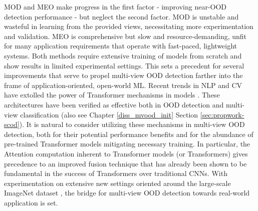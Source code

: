 MOD and MEO make progress in the first factor - improving near-OOD detection performance - but neglect the second factor. MOD is unstable and wasteful in learning from the provided views, necessitating more experimentation and validation. MEO is comprehensive but slow and resource-demanding, unfit for many application requirements that operate with fast-paced, lightweight systems. Both methods require extensive training of models from scratch and show results in limited experimental settings.
This sets a precedent for several improvements that serve to propel multi-view OOD detection farther into the frame of application-oriented, open-world ML. Recent trends in NLP and CV have extolled the power of Transformer mechanisms in models \cite{dosovitskiy2020image,achiam2023gpt,wang2024mutualformer}. These architectures have been verified as effective both in OOD detection and multi-view classification \cite{sun2022out,fort2021exploring,zhao2023cddfuse} (also see Chapter \ref{diss_mvood_init} Section \ref{sec:propwork-scod}). It is natural to consider utilizing these mechanisms in multi-view OOD detection, both for their potential performance benefits and for the abundance of pre-trained Transformer models mitigating necessary training. In particular, the Attention computation inherent to Transformer models (or Transformers) gives precedence to an improved fusion technique that has already been shown to be fundamental in the success of Transformers over traditional CNNs. With experimentation on extensive new settings oriented around the large-scale ImageNet dataset \cite{deng2009imagenet}, the bridge for multi-view OOD detection towards real-world application is set.


